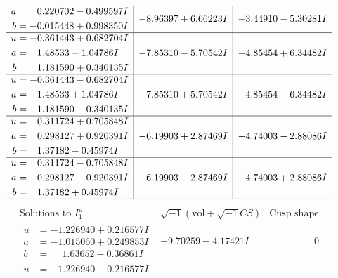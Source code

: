 \documentclass[1p]{elsarticle_modified}
\theoremstyle{definition}
\newcommand{\I}{\sqrt{-1}}
\begin{document}
$$\begin{array}{c|c|c}
\begin{aligned}
a &= \phantom{-}0.220702 - 0.499597 I \\
b &= -0.015448 + 0.998350 I\end{aligned}
 & -8.96397 + 6.66223 I & -3.44910 - 5.30281 I \\ \hline\begin{aligned}
u &= -0.361443 + 0.682704 I \\
a &= \phantom{-}1.48533 - 1.04786 I \\
b &= \phantom{-}1.181590 + 0.340135 I\end{aligned}
 & -7.85310 - 5.70542 I & -4.85454 + 6.34482 I \\ \hline\begin{aligned}
u &= -0.361443 - 0.682704 I \\
a &= \phantom{-}1.48533 + 1.04786 I \\
b &= \phantom{-}1.181590 - 0.340135 I\end{aligned}
 & -7.85310 + 5.70542 I & -4.85454 - 6.34482 I \\ \hline\begin{aligned}
u &= \phantom{-}0.311724 + 0.705848 I \\
a &= \phantom{-}0.298127 + 0.920391 I \\
b &= \phantom{-}1.37182 - 0.45974 I\end{aligned}
 & -6.19903 + 2.87469 I & -4.74003 - 2.88086 I \\ \hline\begin{aligned}
u &= \phantom{-}0.311724 - 0.705848 I \\
a &= \phantom{-}0.298127 - 0.920391 I \\
b &= \phantom{-}1.37182 + 0.45974 I\end{aligned}
 & -6.19903 - 2.87469 I & -4.74003 + 2.88086 I\\
 \hline 
 \end{array}$$\newpage$$\begin{array}{c|c|c}  
\text{Solutions to }I^u_{1}& \I (\text{vol} + \sqrt{-1}CS) & \text{Cusp shape}\\
 \hline 
\begin{aligned}
u &= -1.226940 + 0.216577 I \\
a &= -1.015060 + 0.249853 I \\
b &= \phantom{-}1.63652 - 0.36861 I\end{aligned}
 & -9.70259 - 4.17421 I & \phantom{-0.000000 } 0 \\ \hline\begin{aligned}
u &= -1.226940 - 0.216577 I \\

\end{aligned}
\end{array}$$
\end{document}
